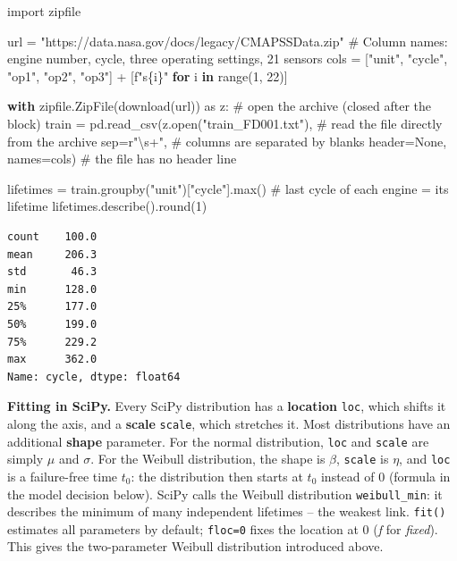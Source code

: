 \documentclass[
  letterpaper,
  DIV=11,
  numbers=noendperiod]{scrreprt}
\newenvironment{Shaded}{\begin{snugshade}}{\end{snugshade}}
\newcommand{\BuiltInTok}[1]{\textcolor[rgb]{0.00,0.23,0.31}{#1}}
\newcommand{\CommentTok}[1]{\textcolor[rgb]{0.37,0.37,0.37}{#1}}
\newcommand{\ControlFlowTok}[1]{\textcolor[rgb]{0.00,0.23,0.31}{\textbf{#1}}}
\newcommand{\DecValTok}[1]{\textcolor[rgb]{0.68,0.00,0.00}{#1}}
\newcommand{\ImportTok}[1]{\textcolor[rgb]{0.00,0.46,0.62}{#1}}
\newcommand{\KeywordTok}[1]{\textcolor[rgb]{0.00,0.23,0.31}{\textbf{#1}}}
\newcommand{\NormalTok}[1]{\textcolor[rgb]{0.00,0.23,0.31}{#1}}
\newcommand{\OperatorTok}[1]{\textcolor[rgb]{0.37,0.37,0.37}{#1}}
\newcommand{\SpecialCharTok}[1]{\textcolor[rgb]{0.37,0.37,0.37}{#1}}
\newcommand{\SpecialStringTok}[1]{\textcolor[rgb]{0.13,0.47,0.30}{#1}}
\newcommand{\StringTok}[1]{\textcolor[rgb]{0.13,0.47,0.30}{#1}}
\newcommand{\VariableTok}[1]{\textcolor[rgb]{0.07,0.07,0.07}{#1}}
\newcommand{\VerbatimStringTok}[1]{\textcolor[rgb]{0.13,0.47,0.30}{#1}}
\begin{document}
\begin{Shaded}
\begin{Highlighting}[]
\ImportTok{import}\NormalTok{ zipfile}

\NormalTok{url }\OperatorTok{=} \StringTok{"https://data.nasa.gov/docs/legacy/CMAPSSData.zip"}
\CommentTok{\# Column names: engine number, cycle, three operating settings, 21 sensors}
\NormalTok{cols }\OperatorTok{=}\NormalTok{ [}\StringTok{"unit"}\NormalTok{, }\StringTok{"cycle"}\NormalTok{, }\StringTok{"op1"}\NormalTok{, }\StringTok{"op2"}\NormalTok{, }\StringTok{"op3"}\NormalTok{] }\OperatorTok{+}\NormalTok{ [}\SpecialStringTok{f"s}\SpecialCharTok{\{}\NormalTok{i}\SpecialCharTok{\}}\SpecialStringTok{"} \ControlFlowTok{for}\NormalTok{ i }\KeywordTok{in} \BuiltInTok{range}\NormalTok{(}\DecValTok{1}\NormalTok{, }\DecValTok{22}\NormalTok{)]}

\ControlFlowTok{with}\NormalTok{ zipfile.ZipFile(download(url)) }\ImportTok{as}\NormalTok{ z:         }\CommentTok{\# open the archive (closed after the block)}
\NormalTok{    train }\OperatorTok{=}\NormalTok{ pd.read\_csv(z.}\BuiltInTok{open}\NormalTok{(}\StringTok{"train\_FD001.txt"}\NormalTok{),  }\CommentTok{\# read the file directly from the archive}
\NormalTok{                        sep}\OperatorTok{=}\VerbatimStringTok{r"\textbackslash{}s+"}\NormalTok{,               }\CommentTok{\# columns are separated by blanks}
\NormalTok{                        header}\OperatorTok{=}\VariableTok{None}\NormalTok{, names}\OperatorTok{=}\NormalTok{cols)  }\CommentTok{\# the file has no header line}

\NormalTok{lifetimes }\OperatorTok{=}\NormalTok{ train.groupby(}\StringTok{"unit"}\NormalTok{)[}\StringTok{"cycle"}\NormalTok{].}\BuiltInTok{max}\NormalTok{()  }\CommentTok{\# last cycle of each engine = its lifetime}
\NormalTok{lifetimes.describe().}\BuiltInTok{round}\NormalTok{(}\DecValTok{1}\NormalTok{)}
\end{Highlighting}
\end{Shaded}

\begin{verbatim}
count    100.0
mean     206.3
std       46.3
min      128.0
25%      177.0
50%      199.0
75%      229.2
max      362.0
Name: cycle, dtype: float64
\end{verbatim}

\textbf{Fitting in SciPy.} Every SciPy distribution has a
\textbf{location} \texttt{loc}, which shifts it along the axis, and a
\textbf{scale} \texttt{scale}, which stretches it. Most distributions
have an additional \textbf{shape} parameter. For the normal
distribution, \texttt{loc} and \texttt{scale} are simply \(\mu\) and
\(\sigma\). For the Weibull distribution, the shape is \(\beta\),
\texttt{scale} is \(\eta\), and \texttt{loc} is a failure-free time
\(t_0\): the distribution then starts at \(t_0\) instead of 0 (formula
in the model decision below). SciPy calls the Weibull distribution
\texttt{weibull\_min}: it describes the minimum of many independent
lifetimes -- the weakest link. \texttt{fit()} estimates all parameters
by default; \texttt{floc=0} fixes the location at 0 (\emph{f} for
\emph{fixed}). This gives the two-parameter Weibull distribution
introduced above.
\end{document}

